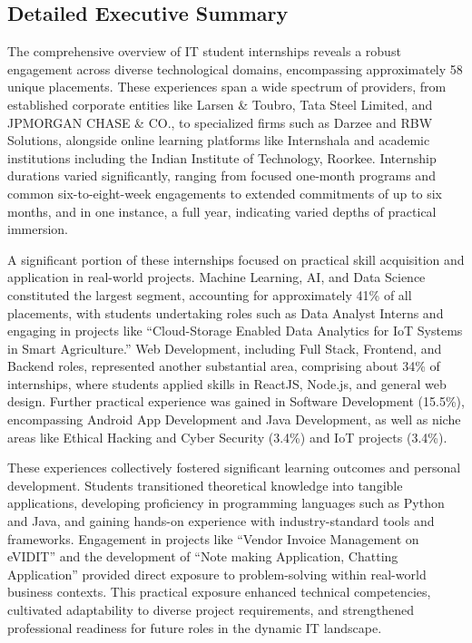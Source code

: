 \documentclass[11pt,a4paper]{article}
\newenvironment{card}{
    \begin{tcolorbox}[
        enhanced,
        colback=cardback,
        colframe=border,
        sharp corners,
        boxrule=0.5pt,
        drop shadow,
        drop shadow={shadow xshift=1mm,shadow yshift=-1mm,fill=border!50},
        boxsep=3mm,
        left=5mm, right=5mm, top=5mm, bottom=5mm,
        width=\textwidth,
        nobeforeafter
    ]
}{\end{tcolorbox}}
\begin{document}
\begin{card}
    \subsection*{\textcolor{accent}{Detailed Executive Summary}}
    \vspace{0.3cm}
    The comprehensive overview of IT student internships reveals a robust engagement across diverse technological domains, encompassing approximately 58 unique placements. These experiences span a wide spectrum of providers, from established corporate entities like Larsen \& Toubro, Tata Steel Limited, and JPMORGAN CHASE \& CO., to specialized firms such as Darzee and RBW Solutions, alongside online learning platforms like Internshala and academic institutions including the Indian Institute of Technology, Roorkee. Internship durations varied significantly, ranging from focused one-month programs and common six-to-eight-week engagements to extended commitments of up to six months, and in one instance, a full year, indicating varied depths of practical immersion.

    A significant portion of these internships focused on practical skill acquisition and application in real-world projects. Machine Learning, AI, and Data Science constituted the largest segment, accounting for approximately 41\% of all placements, with students undertaking roles such as Data Analyst Interns and engaging in projects like ``Cloud-Storage Enabled Data Analytics for IoT Systems in Smart Agriculture.'' Web Development, including Full Stack, Frontend, and Backend roles, represented another substantial area, comprising about 34\% of internships, where students applied skills in ReactJS, Node.js, and general web design. Further practical experience was gained in Software Development (15.5\%), encompassing Android App Development and Java Development, as well as niche areas like Ethical Hacking and Cyber Security (3.4\%) and IoT projects (3.4\%).

    These experiences collectively fostered significant learning outcomes and personal development. Students transitioned theoretical knowledge into tangible applications, developing proficiency in programming languages such as Python and Java, and gaining hands-on experience with industry-standard tools and frameworks. Engagement in projects like ``Vendor Invoice Management on eVIDIT'' and the development of ``Note making Application, Chatting Application'' provided direct exposure to problem-solving within real-world business contexts. This practical exposure enhanced technical competencies, cultivated adaptability to diverse project requirements, and strengthened professional readiness for future roles in the dynamic IT landscape.
\end{card}
\end{document}
